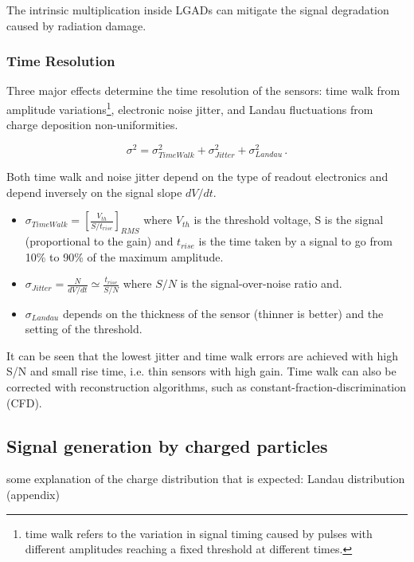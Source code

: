 The intrinsic multiplication inside LGADs can mitigate the signal degradation caused by radiation damage.

\subsubsection{Time Resolution}

Three major effects determine the time resolution of the sensors: time walk from amplitude variations\footnote{time walk refers to the variation in signal timing caused by pulses with different amplitudes reaching a fixed threshold at different times.}, electronic noise jitter, and Landau fluctuations from charge deposition non-uniformities.

\begin{equation}\label{eq:time_resoltuion_LGADs}
    \sigma^2 = \sigma_{TimeWalk}^2 + \sigma_{Jitter}^2 + \sigma_{Landau}^2  \, .
\end{equation}

 Both time walk and noise jitter depend on the type of readout electronics and depend inversely on the signal slope $dV/dt$.

\begin{itemize}
    \item $\sigma_{TimeWalk} = \left[ \frac{V_{th}}{S/t_{rise}}\right]_{RMS}$ where $V_{th}$ is the threshold voltage, S is the signal (proportional to the gain) and $t_{rise}$ is the time taken by a signal to go from 10\% to 90\% of the maximum amplitude.
    \item $\sigma_{Jitter} = \frac{N}{dV/dt} \simeq \frac{t_{rise}}{S/N}$ where $S/N$ is the signal-over-noise ratio and.
    \item $\sigma_{Landau}$ depends on the thickness of the sensor (thinner is better) and the setting of the threshold.
\end{itemize}

It can be seen that the lowest jitter and time walk errors are achieved with high S/N and small rise time, i.e. thin sensors with high gain. Time walk can also be corrected with reconstruction algorithms, such as constant-fraction-discrimination (CFD).

\subsection{Signal generation by charged particles}

some explanation of the charge distribution that is expected: Landau distribution (appendix)



